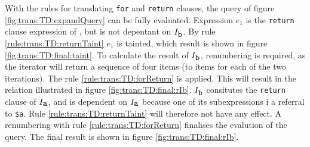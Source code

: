 \begin{myExample}

With the rules for translating \texttt{for} and \texttt{return} clauses, the query of figure
\ref{fig:trans:TD:expandQuery} can be fully evaluated. Expression $e_{1}$ is the \texttt{return} clause expression
of , but is not depentant on $I_{\mbox{\texttt{b}}}$. By rule \ref{rule:trans:TD:returnTaint} $e_{1}$ is tainted,
which result is shown in figure \ref{fig:trans:TD:final:taint}. To calculate the result of $I_{\mbox{\texttt{b}}}$,
renumbering is required, as the iterator will return a sequence of four items (to items for each of the two
iterations). The rule \ref{rule:trans:TD:forReturn} is applied. This will result in the relation illustrated in
figure \ref{fig:trans:TD:final:rIb}. $I_{\mbox{\texttt{b}}}$ consitutes the \texttt{return} clause of
$I_{\mbox{\texttt{a}}}$, and is dependent on $I_{\mbox{\texttt{a}}}$ because one of its subexpressions i a
referral to \texttt{\$a}. Rule \ref{rule:trans:TD:returnTaint} will therefore not have any effect. A renumbering
with rule \ref{rule:trans:TD:forReturn} finalises the evalution of the query. The final result is shown in figure
\ref{fig:trans:TD:final:rIb}.



\end{myExample}
